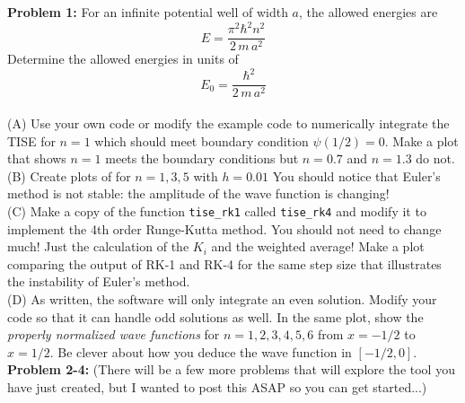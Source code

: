 \documentclass[12pt]{book}
\begin{document}
\noindent
{\bf Problem 1:}  For an infinite potential well of width $a$, the allowed energies are
$$E = \frac{\pi^2 \hbar^2 n^2}{2 \, m \, a^2}$$  
Determine the allowed energies in units of 
$$E_0 = \frac{\hbar^2}{2 \, m \, a^2}$$\\[3pt]
\noindent
(A) Use your own code or modify the example code to numerically integrate the TISE for $n=1$ which should meet boundary condition $\psi(1/2)=0$.  Make a plot that shows $n=1$ meets the boundary conditions but $n=0.7$ and $n=1.3$ do not.\\[5pt]
(B) Create plots of for $n=1,3,5$ with $h=0.01$  You should notice that Euler's method 
is not stable:  the amplitude of the wave function is changing!\\[5pt]
(C) Make a copy of the function {\tt tise\_rk1} called {\tt tise\_rk4} and modify it to implement the 4th order Runge-Kutta method.  You should not need to change much!  Just the calculation of the $K_i$ and the weighted average!  Make a plot comparing the output of RK-1 and RK-4 for the same step size that illustrates the instability of Euler's method. \\[5pt]
(D) As written, the software will only integrate an even solution.  Modify your code so that it can handle odd solutions as well.  In the same plot, show the {\em properly normalized wave functions} for $n=1,2,3,4,5,6$ from $x=-1/2$ to $x=1/2$.  Be clever about how you deduce the wave function in $[-1/2,0]$.\\[5pt]

{\bf Problem 2-4:}
(There will be a few more problems that will explore the tool you have just created, but I wanted to post this ASAP so you can get started...)
\end{document}
